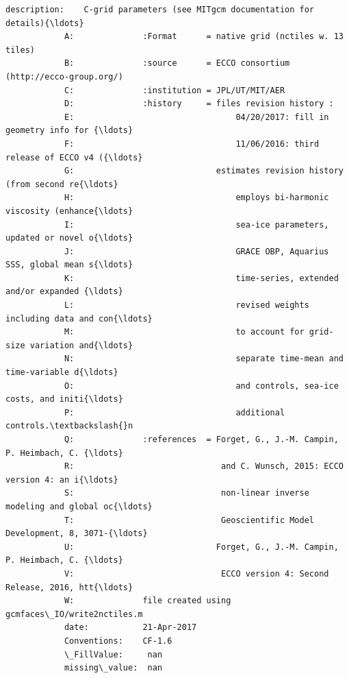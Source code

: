 \documentclass[11pt]{article}
\begin{document}
\begin{Verbatim}[commandchars=\\\{\}]
            description:    C-grid parameters (see MITgcm documentation for details){\ldots}
            A:              :Format      = native grid (nctiles w. 13 tiles)
            B:              :source      = ECCO consortium (http://ecco-group.org/)
            C:              :institution = JPL/UT/MIT/AER
            D:              :history     = files revision history :
            E:                                 04/20/2017: fill in geometry info for {\ldots}
            F:                                 11/06/2016: third release of ECCO v4 ({\ldots}
            G:                             estimates revision history (from second re{\ldots}
            H:                                 employs bi-harmonic viscosity (enhance{\ldots}
            I:                                 sea-ice parameters, updated or novel o{\ldots}
            J:                                 GRACE OBP, Aquarius SSS, global mean s{\ldots}
            K:                                 time-series, extended and/or expanded {\ldots}
            L:                                 revised weights including data and con{\ldots}
            M:                                 to account for grid-size variation and{\ldots}
            N:                                 separate time-mean and time-variable d{\ldots}
            O:                                 and controls, sea-ice costs, and initi{\ldots}
            P:                                 additional controls.\textbackslash{}n 
            Q:              :references  = Forget, G., J.-M. Campin, P. Heimbach, C. {\ldots}
            R:                              and C. Wunsch, 2015: ECCO version 4: an i{\ldots}
            S:                              non-linear inverse modeling and global oc{\ldots}
            T:                              Geoscientific Model Development, 8, 3071-{\ldots}
            U:                             Forget, G., J.-M. Campin, P. Heimbach, C. {\ldots}
            V:                              ECCO version 4: Second Release, 2016, htt{\ldots}
            W:              file created using gcmfaces\_IO/write2nctiles.m
            date:           21-Apr-2017
            Conventions:    CF-1.6
            \_FillValue:     nan
            missing\_value:  nan
\end{Verbatim}
            

    
    
    
    
\end{document}
